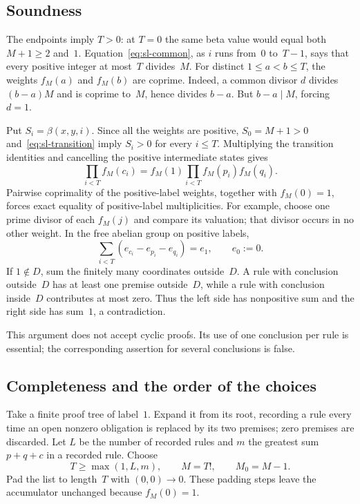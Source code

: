 \subsection{Soundness}

The endpoints imply $T>0$: at $T=0$ the same beta value would equal both
$M+1\geq2$ and~$1$.  Equation~\eqref{eq:sl-common}, as $i$ runs from~$0$
to~$T-1$, says that every positive integer at most~$T$ divides~$M$.
For distinct $1\leq a<b\leq T$, the weights $f_M(a)$ and $f_M(b)$ are
coprime.  Indeed, a common divisor $d$ divides $(b-a)M$ and is coprime
to~$M$, hence divides $b-a$.  But $b-a\mid M$, forcing $d=1$.

Put $S_i=\beta(x,y,i)$.  Since all the weights are positive, $S_0=M+1>0$
and~\eqref{eq:sl-transition} imply $S_i>0$ for every $i\leq T$.
Multiplying the transition identities and cancelling the positive intermediate
states gives
\[
 \prod_{i<T} f_M(c_i)
 =f_M(1)\prod_{i<T}f_M(p_i)f_M(q_i).
\]
Pairwise coprimality of the positive-label weights, together with $f_M(0)=1$,
forces exact equality of positive-label multiplicities.  For example, choose
one prime divisor of each $f_M(j)$ and compare its valuation; that divisor
occurs in no other weight.  In the free abelian group on positive labels,
\[
 \sum_{i<T}(e_{c_i}-e_{p_i}-e_{q_i})=e_1,
 \qquad e_0:=0.
\]
If $1\notin D$, sum the finitely many coordinates outside~$D$.  A rule with
conclusion outside~$D$ has at least one premise outside~$D$, while a rule
with conclusion inside~$D$ contributes at most zero.  Thus the left side
has nonpositive sum and the right side has sum~$1$, a contradiction.

This argument does not accept cyclic proofs.  Its use of one conclusion per
rule is essential; the corresponding assertion for several conclusions is
false.

\subsection{Completeness and the order of the choices}

Take a finite proof tree of label~$1$.  Expand it from its root, recording a
rule every time an open nonzero obligation is replaced by its two premises;
zero premises are discarded.  Let $L$ be the number of recorded rules and
$m$ the greatest sum $p+q+c$ in a recorded rule.  Choose
\[
 T\geq\max(1,L,m),\qquad M=T!,\qquad M_0=M-1.
\]
Pad the list to length~$T$ with $(0,0)\longrightarrow0$.  These padding steps
leave the accumulator unchanged because $f_M(0)=1$.

